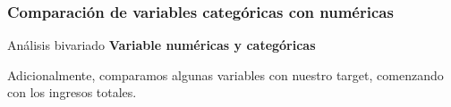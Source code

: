 \documentclass[pdf]{beamer}
\begin{document}
    \subsubsection{Comparación de variables categóricas con numéricas}

\begin{frame}{Análisis bivariado}
\textbf{Variable numéricas y categóricas}

    Adicionalmente, comparamos algunas variables con nuestro target, comenzando con los ingresos totales.






 
 
 


\end{frame}
\end{document}
